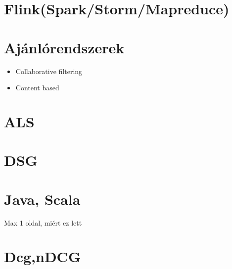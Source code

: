 \documentclass[a4paper,12pt]{article}
\begin{document}
\section{Flink(Spark/Storm/Mapreduce)}
\section{Ajánlórendszerek}
\begin{itemize}
\item Collaborative filtering
\item Content based
\end{itemize}
\section{ALS}
\section{DSG}
\section{Java, Scala}
Max 1 oldal, miért ez lett
\section{Dcg,nDCG}
\end{document}
